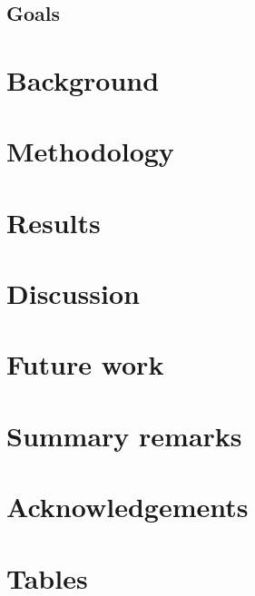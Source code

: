 \documentclass[11pt,a4paper]{article}
\begin{document}
\subsection{Goals} \label{sec-goals}

\newpage

\section{Background} \label{sec-background}

\newpage

\section{Methodology} \label{sec-methodology}

\newpage

\section{Results} \label{sec-results}

\newpage

\section{Discussion} \label{sec-discussion}

\newpage

\section{Future work} \label{sec-future-work}

\newpage

\section{Summary remarks} \label{sec-summary-remarks}

\newpage 

\section*{Acknowledgements}

\newpage


\setlength{\bibhang}{0pt}


\newpage

\section*{Tables}
\end{document}
